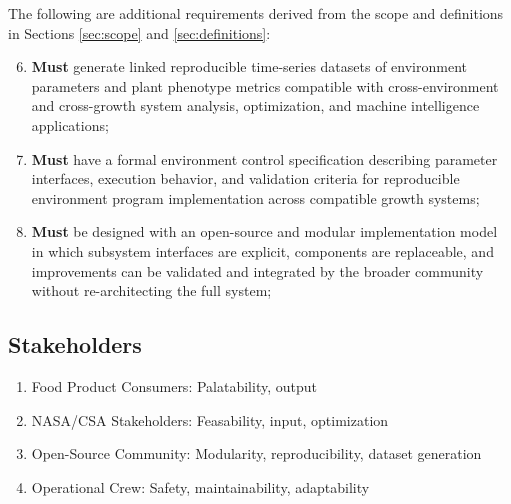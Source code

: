 \documentclass{../tex/report}
\begin{document}
\clearpage

The following are additional requirements derived from the scope and definitions in Sections \ref{sec:scope} and \ref{sec:definitions}:

\begin{enumerate}[label=R\arabic*., ref=R\arabic*]
    \setcounter{enumi}{5}
    \item \label{r:6} \textbf{Must} generate linked reproducible time-series datasets of environment parameters and plant phenotype metrics compatible with cross-environment and cross-growth system analysis, optimization, and machine intelligence applications;
    \item \label{r:7} \textbf{Must} have a formal environment control specification describing parameter interfaces, execution behavior, and validation criteria for reproducible environment program implementation across compatible growth systems;
    \item \label{r:8} \textbf{Must} be designed with an open-source and modular implementation model in which subsystem interfaces are explicit, components are replaceable, and improvements can be validated and integrated by the broader community without re-architecting the full system;
\end{enumerate}


\subsection{Stakeholders}
\label{sec:stakeholders}

\begin{enumerate}[label=S\arabic*., ref=S\arabic*]
    \item \label{s:1} Food Product Consumers: Palatability, output
    \item \label{s:2} NASA/CSA Stakeholders: Feasability, input, optimization
    \item \label{s:3} Open-Source Community: Modularity, reproducibility, dataset generation
    \item \label{s:4} Operational Crew: Safety, maintainability, adaptability
\end{enumerate}
\end{document}
